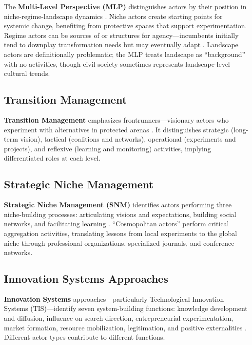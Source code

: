 \documentclass[../main.tex]{subfiles}
\begin{document}
The \textbf{Multi-Level Perspective (MLP)} distinguishes actors by their position in niche-regime-landscape dynamics . Niche actors create starting points for systemic change, benefiting from protective spaces that support experimentation. Regime actors can be sources of or structures for agency---incumbents initially tend to downplay transformation needs but may eventually adapt \cite{geels2004mlp}. Landscape actors are definitionally problematic; the MLP treats landscape as ``background'' with no activities, though civil society sometimes represents landscape-level cultural trends.

\subsection{Transition Management}

\textbf{Transition Management} emphasizes frontrunners---visionary actors who experiment with alternatives in protected arenas . It distinguishes strategic (long-term vision), tactical (coalitions and networks), operational (experiments and projects), and reflexive (learning and monitoring) activities, implying differentiated roles at each level.

\subsection{Strategic Niche Management}

\textbf{Strategic Niche Management (SNM)} identifies actors performing three niche-building processes: articulating visions and expectations, building social networks, and facilitating learning . ``Cosmopolitan actors'' perform critical aggregation activities, translating lessons from local experiments to the global niche through professional organizations, specialized journals, and conference networks.

\subsection{Innovation Systems Approaches}

\textbf{Innovation Systems} approaches---particularly Technological Innovation Systems (TIS)---identify seven system-building functions: knowledge development and diffusion, influence on search direction, entrepreneurial experimentation, market formation, resource mobilization, legitimation, and positive externalities . Different actor types contribute to different functions.
\end{document}
